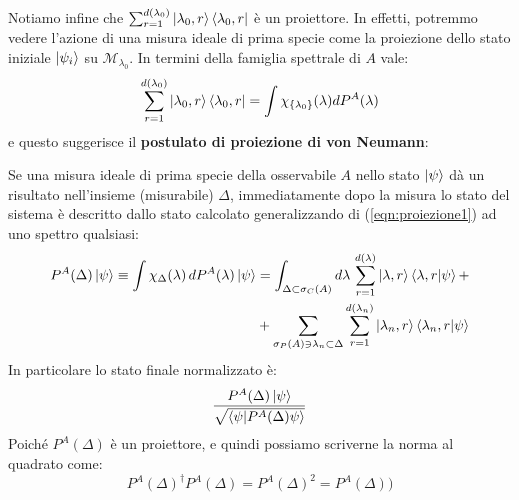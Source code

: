 \documentclass[../../FisicaTeorica.tex]{subfiles}
\begin{document}
Notiamo infine che $\sum_{r=1}^{d(\lambda_0)}\ket{\lambda_0,r}\bra{\lambda_0,r}$ è un proiettore. In effetti, potremmo vedere l'azione di una misura ideale di prima specie come la proiezione dello stato iniziale $\ket{\psi_i}$ su $\mathcal{M}_{\lambda_0}$. In termini della famiglia spettrale di $A$ vale:
\begin{equation}
\sum_{r=1}^{d(\lambda_0)} \ket{\lambda_0,r}\bra{\lambda_0,r} = \int \chi_{\{\lambda_0\}}(\lambda) dP^A(\lambda)
\label{eqn:proiezione1}
\end{equation}
e questo suggerisce il \textbf{postulato di proiezione di von Neumann}:\\
\begin{axi}
Se una misura ideale di prima specie della osservabile $A$ nello stato $\ket{\psi}$ dà un risultato nell'insieme (misurabile) $\Delta$, immediatamente dopo la misura lo stato del sistema è descritto dallo stato calcolato generalizzando di (\ref{eqn:proiezione1}) ad uno spettro qualsiasi:
\begin{align*}
P^A(\Delta)\ket{\psi} \equiv \int \chi_\Delta(\lambda)\,dP^A(\lambda)\ket{\psi}&=\int_{\Delta \subset \sigma_C(A)} d\lambda\, \sum_{r=1}^{d(\lambda)}\ket{\lambda,r}\braket{\lambda,r|\psi}+\\
&+ \sum_{\sigma_P(A)\ni \lambda_n \subset \Delta} \sum_{r=1}^{d(\lambda_n)} \ket{\lambda_n,r}\braket{\lambda_n,r|\psi}
\end{align*}
In particolare lo stato finale normalizzato è:
\[
\frac{P^A(\Delta)\ket{\psi}}{\sqrt{\braket{\psi|P^A(\Delta)\psi}}}
\]
Poiché $P^A(\Delta)$ è un proiettore, e quindi possiamo scriverne la norma al quadrato come:
\[
P^A(\Delta)^\dag P^A(\Delta)=P^A(\Delta)^2=P^A(\Delta))
\]
\end{axi}
\end{document}

